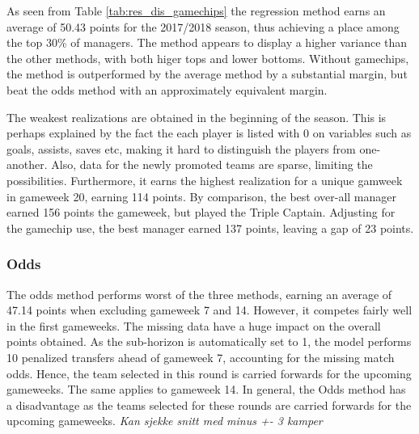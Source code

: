 As seen from Table \ref{tab:res_dis_gamechips} the regression method earns an average of 50.43 points for the 2017/2018 season, thus achieving a place among the top 30\% of managers. The method appears to display a higher variance than the other methods, with both higer tops and lower bottoms. Without gamechips, the method is outperformed by the average method by a substantial margin, but beat the odds method with an approximately equivalent margin. 

\newpar

The weakest realizations are obtained in the beginning of the season. This is perhaps explained by the fact the each player is listed with 0 on variables such as goals, assists,  saves etc, making it hard to distinguish the players from one-another. Also, data for the newly promoted teams are sparse, limiting the possibilities. Furthermore, it earns the highest realization for a unique gamweek in gameweek 20, earning 114 points. By comparison, the best over-all manager earned 156 points the  gameweek, but played the Triple Captain. Adjusting for the gamechip use, the best manager earned 137 points, leaving a gap of 23 points.

\subsubsection{Odds}

The odds method performs worst of the three methods, earning an average of 47.14 points when excluding gameweek 7 and 14. However, it competes fairly well in the first gameweeks. The missing data have a huge impact on the overall points obtained. As the sub-horizon is automatically set to 1, the model performs 10 penalized transfers ahead of gameweek 7, accounting for the missing match odds. Hence, the team selected in this round is carried forwards for the upcoming gameweeks. The same applies to gameweek 14. 
\newpar
In general, the Odds method has a disadvantage as the teams selected for these rounds are carried forwards for the upcoming gameweeks. \textit{Kan sjekke snitt med minus +- 3 kamper}

